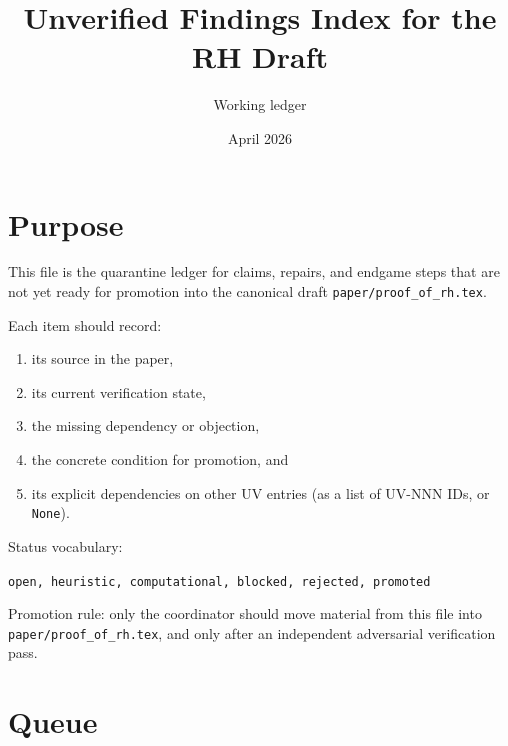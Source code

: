 \documentclass[11pt,a4paper]{amsart}
\title{Unverified Findings Index for the RH Draft}
\author{Working ledger}
\date{April 2026}
\begin{document}
\maketitle

\section*{Purpose}

This file is the quarantine ledger for claims, repairs, and endgame steps that
are not yet ready for promotion into the canonical draft
\texttt{paper/proof\_of\_rh.tex}.

Each item should record:
\begin{enumerate}[nosep]
    \item its source in the paper,
    \item its current verification state,
    \item the missing dependency or objection,
    \item the concrete condition for promotion, and
    \item its explicit dependencies on other UV entries (as a list of
          UV-NNN IDs, or \texttt{None}).
\end{enumerate}

Status vocabulary:
\begin{center}
\texttt{open, heuristic, computational, blocked, rejected, promoted}
\end{center}

Promotion rule: only the coordinator should move material from this file into
\texttt{paper/proof\_of\_rh.tex}, and only after an independent adversarial
verification pass.

\section*{Queue}
\end{document}
